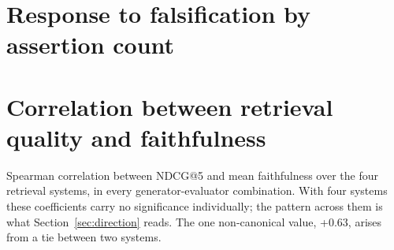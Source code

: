 \documentclass[11pt]{article}
\begin{document}
\section{Response to falsification by assertion count}
\label{app:assertions}

\begin{table}[t]
\centering
\small
{}
\caption{Drop in score when one grounded value is falsified, by number of assertions in the answer, on Natural Questions. Under NLI-max the response decays as answers accumulate assertions; under claim-level aggregation it does not. The GPT-4o-mini rows beyond two assertions rest on 26, 10 and 7 cases and should be read as such. In the single-assertion row the two aggregates coincide exactly, which is the degenerate case they must reduce to.}
\label{tab:3}
\end{table}

\section{Correlation between retrieval quality and faithfulness}
\label{app:spearman}

Spearman correlation between NDCG@5 and mean faithfulness over the four retrieval systems, in every generator-evaluator combination. With four systems these coefficients carry no significance individually; the pattern across them is what Section~\ref{sec:direction} reads. The one non-canonical value, +0.63, arises from a tie between two systems.
\end{document}
